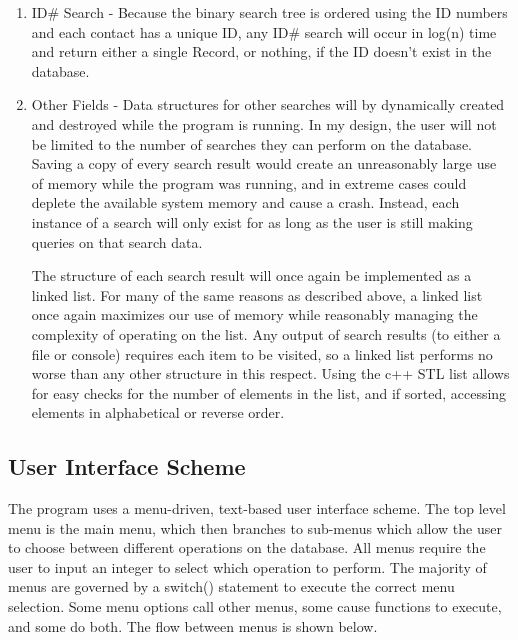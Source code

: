 \documentclass[11pt]{article}
\begin{document}
\begin{enumerate}
		\begin{enumerate}
			\item ID\# Search - Because the binary search tree is ordered using the ID numbers and each contact has a unique
								ID, any ID\# search will occur in log(n) time and return either a single Record, or nothing, 
								if the ID doesn't exist in the database.
			
			\item Other Fields - Data structures for other searches will by dynamically created and destroyed while the 
								 program is running. In my design, the user will not be limited to the number of searches
								 they can perform on the database. Saving a copy of every search result would create an
								 unreasonably large use of memory while the program was running, and in extreme cases could
								 deplete the available system memory and cause a crash. Instead, each instance of a search
								 will only exist for as long as the user is still making queries on that search data.
								 
								 The structure of each search result will once again be implemented as a linked list. For 
								 many of the same reasons as described above, a linked list once again maximizes our use 
								 of memory while reasonably managing the complexity of operating on the list. Any output of 
								 search results (to either a file or console) requires each item to be visited, so a linked
								 list performs no worse than any other structure in this respect. Using the c++ STL list 
								 allows for easy checks for the number of elements in the list, and if sorted, accessing
								 elements in alphabetical or reverse order.
		\end{enumerate}
			  		
		
	\end{enumerate}

\subsection*{User Interface Scheme}


	The program uses a menu-driven, text-based user interface scheme. The top level menu is the main menu, which then 
branches to sub-menus which allow the user to choose between different operations on the database. All menus require the
user to input an integer to select which operation to perform. The majority of menus are governed by a switch() 
statement to execute the correct menu selection. Some menu options call other menus, some cause functions to execute, and
some do both. The flow between menus is shown below.
\end{document}
